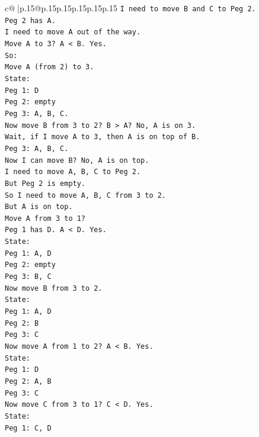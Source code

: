\documentclass{article}
\begin{document}
{\begin{supertabular}{c@{$\;$}|p{.15\linewidth}@{}p{.15\linewidth}p{.15\linewidth}p{.15\linewidth}p{.15\linewidth}p{.15\linewidth}}
{{{\texttt{I need to move B and C to Peg 2.} \\
\texttt{Peg 2 has A.} \\
\texttt{I need to move A out of the way.} \\
\texttt{Move A to 3? A < B. Yes.} \\
\texttt{So:} \\
\texttt{Move A (from 2) to 3.} \\
\texttt{State:} \\
\texttt{Peg 1: D} \\
\texttt{Peg 2: empty} \\
\texttt{Peg 3: A, B, C.} \\
\texttt{Now move B from 3 to 2? B > A? No, A is on 3.} \\
\texttt{Wait, if I move A to 3, then A is on top of B.} \\
\texttt{Peg 3: A, B, C.} \\
\texttt{Now I can move B? No, A is on top.} \\
\texttt{I need to move A, B, C to Peg 2.} \\
\texttt{But Peg 2 is empty.} \\
\texttt{So I need to move A, B, C from 3 to 2.} \\
\texttt{But A is on top.} \\
\texttt{Move A from 3 to 1?} \\
\texttt{Peg 1 has D. A < D. Yes.} \\
\texttt{State:} \\
\texttt{Peg 1: A, D} \\
\texttt{Peg 2: empty} \\
\texttt{Peg 3: B, C} \\
\texttt{Now move B from 3 to 2.} \\
\texttt{State:} \\
\texttt{Peg 1: A, D} \\
\texttt{Peg 2: B} \\
\texttt{Peg 3: C} \\
\texttt{Now move A from 1 to 2? A < B. Yes.} \\
\texttt{State:} \\
\texttt{Peg 1: D} \\
\texttt{Peg 2: A, B} \\
\texttt{Peg 3: C} \\
\texttt{Now move C from 3 to 1? C < D. Yes.} \\
\texttt{State:} \\
\texttt{Peg 1: C, D} \\
}}}
\end{supertabular}}
\end{document}
